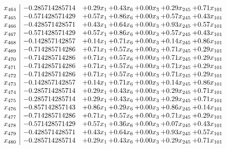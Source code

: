 \documentclass[8pt]{article}
\begin{document}
\[\begin{array}{c| c c@{\hskip 2pt} c@{\hskip 2pt} c@{\hskip 2pt} c@{\hskip 2pt} c@{\hskip 2pt} }
 x_{464}   &  -0.285714285714 & +  0.29 x_{1} & +  0.43 x_{6} & +  0.00 x_{3} & +  0.29 x_{245} & +  0.71 x_{101}\\
 x_{465}   &  -0.571428571429 & +  0.57 x_{1} & +  0.86 x_{6} & +  0.00 x_{3} & +  0.57 x_{245} & +  0.43 x_{101}\\
 x_{466}   &  -0.428571428571 & +  0.43 x_{1} & +  0.64 x_{6} & +  0.00 x_{3} & +  0.93 x_{245} & +  0.57 x_{101}\\
 x_{467}   &  -0.571428571429 & +  0.57 x_{1} & +  0.86 x_{6} & +  0.00 x_{3} & +  0.57 x_{245} & +  0.43 x_{101}\\
 x_{468}   &  -0.142857142857 & +  0.14 x_{1} & +  0.71 x_{6} & +  0.00 x_{3} & +  0.14 x_{245} & +  0.86 x_{101}\\
 x_{469}   &  -0.714285714286 & +  0.71 x_{1} & +  0.57 x_{6} & +  0.00 x_{3} & +  0.71 x_{245} & +  0.29 x_{101}\\
 x_{470}   &  -0.714285714286 & +  0.71 x_{1} & +  0.57 x_{6} & +  0.00 x_{3} & +  0.71 x_{245} & +  0.29 x_{101}\\
 x_{471}   &  -0.714285714286 & +  0.71 x_{1} & +  0.57 x_{6} & +  0.00 x_{3} & +  0.71 x_{245} & +  0.29 x_{101}\\
 x_{472}   &  -0.714285714286 & +  0.71 x_{1} & +  0.57 x_{6} & +  0.00 x_{3} & +  0.71 x_{245} & +  0.29 x_{101}\\
 x_{473}   &  -0.142857142857 & +  0.14 x_{1} & +  0.71 x_{6} & +  0.00 x_{3} & +  0.14 x_{245} & +  0.86 x_{101}\\
 x_{474}   &  -0.285714285714 & +  0.29 x_{1} & +  0.43 x_{6} & +  0.00 x_{3} & +  0.29 x_{245} & +  0.71 x_{101}\\
 x_{475}   &  -0.285714285714 & +  0.29 x_{1} & +  0.43 x_{6} & +  0.00 x_{3} & +  0.29 x_{245} & +  0.71 x_{101}\\
 x_{476}   &  -0.857142857143 & +  0.86 x_{1} & +  0.29 x_{6} & +  0.00 x_{3} & +  0.86 x_{245} & +  0.14 x_{101}\\
 x_{477}   &  -0.714285714286 & +  0.71 x_{1} & +  0.57 x_{6} & +  0.00 x_{3} & +  0.71 x_{245} & +  0.29 x_{101}\\
 x_{478}   &  -0.571428571429 & +  0.57 x_{1} & +  0.36 x_{6} & +  0.00 x_{3} & +  0.07 x_{245} & +  0.43 x_{101}\\
 x_{479}   &  -0.428571428571 & +  0.43 x_{1} & +  0.64 x_{6} & +  0.00 x_{3} & +  0.93 x_{245} & +  0.57 x_{101}\\
 x_{480}   &  -0.285714285714 & +  0.29 x_{1} & +  0.43 x_{6} & +  0.00 x_{3} & +  0.29 x_{245} & +  0.71 x_{101}\\

\end{array}\]
\end{document}

